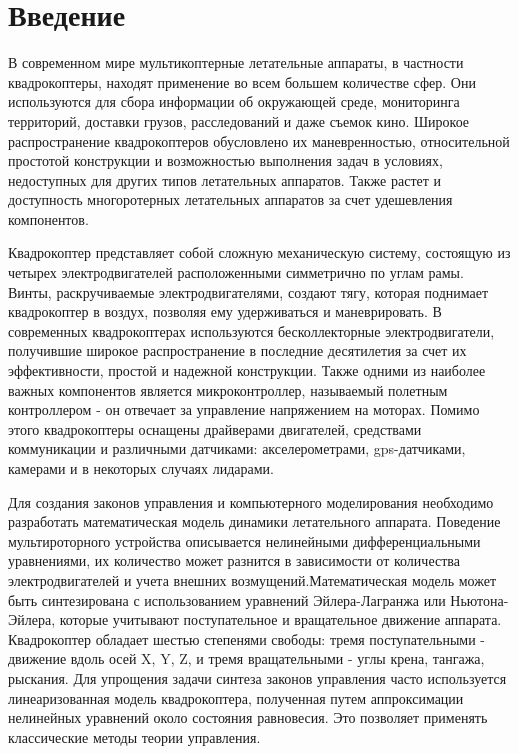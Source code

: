 \chapter*{Введение}
\label{ch:chap1}



В современном мире мультикоптерные летательные аппараты, 
в частности квадрокоптеры, находят применение во всем большем количестве 
сфер. Они используются для сбора информации об окружающей 
среде, мониторинга территорий, доставки грузов, расследований
и даже съемок кино. 
Широкое распространение квадрокоптеров обусловлено 
их маневренностью, относительной простотой конструкции и 
возможностью выполнения задач в условиях, недоступных 
для других типов летательных аппаратов. Также растет и доступность многоротерных 
летательных аппаратов за счет удешевления компонентов.

Квадрокоптер представляет собой сложную механическую систему, состоящую из 
четырех электродвигателей расположенными симметрично по углам рамы. 
Винты, раскручиваемые электродвигателями, создают тягу, которая поднимает квадрокоптер в воздух, 
позволяя ему удерживаться и маневрировать. В современных квадрокоптерах 
используются бесколлекторные электродвигатели, получившие широкое 
распространение в последние десятилетия за счет их эффективности, 
простой и надежной конструкции. Также одними из наиболее важных 
компонентов является микроконтроллер, называемый полетным контроллером - 
он отвечает за управление напряжением на моторах. Помимо этого квадрокоптеры 
оснащены драйверами двигателей, средствами коммуникации и различными датчиками: 
акселерометрами, gps-датчиками, камерами и в некоторых случаях лидарами.

Для создания законов управления и компьютерного моделирования необходимо разработать
математическая модель динамики летательного аппарата. Поведение мультироторного 
устройства описывается нелинейными дифференциальными уравнениями, их 
количество может разнится в зависимости от количества электродвигателей 
и учета внешних возмущений.Математическая модель может быть синтезирована с использованием 
уравнений Эйлера-Лагранжа или Ньютона-Эйлера, которые учитывают поступательное и 
вращательное движение аппарата.  Квадрокоптер обладает шестью степенями свободы:
тремя поступательными - движение вдоль осей X, Y, Z, и тремя вращательными - углы крена, тангажа, рыскания.
Для упрощения задачи синтеза законов управления часто используется 
линеаризованная модель квадрокоптера, полученная путем аппроксимации 
нелинейных уравнений около состояния равновесия. Это позволяет применять 
классические методы теории управления.


